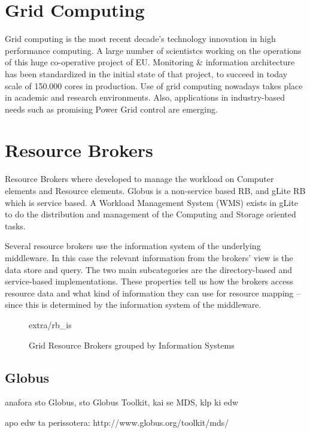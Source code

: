 \section{Grid Computing}
Grid computing \cite{li2005grid} is the most recent decade's technology
innovation in high performance computing. A large number of scientistcs working
on the operations of this huge co-operative project of EU. Monitoring \&
information architecture \cite{fisher2002datagrid} has been standardized in the
initial state of that project, to succeed in today scale of 150.000 cores in
production. Use of grid computing nowadays takes place in academic and research
environments. Also, applications in industry-based needs such as promising
Power Grid control \cite{Taylor2006} are emerging.

\section{Resource Brokers}
Resource Brokers \cite{Kertesz06ataxonomy} where developed to manage the
workload on Computer elements and Resource elements. Globus is a
non-service based RB, and gLite RB which is service based. A Workload
Management System (WMS) exists in gLite to do the distribution and management of
the Computing and Storage oriented tasks.

Several resource brokers use the information system of the underlying
middleware. In this case the relevant information from the brokers’ view is the
data store and query. The two main subcategories are the directory-based and
service-based implementations. These properties tell us how the brokers access
resource data and what kind of information they can use for resource mapping –
since this is determined by the information system of the middleware.
\begin{figure}
\begin{center}
 {extra/rb_is}
\caption{Grid Resource Brokers grouped by Information
Systems\cite{Kertesz06ataxonomy}}
\end{center}
\end{figure}

\subsection{Globus}
anafora sto Globus, sto Globus Toolkit, kai se MDS, klp 
ki edw \cite{von1998usage,945188,zhang2004performance}

apo edw ta perissotera: http://www.globus.org/toolkit/mds/

